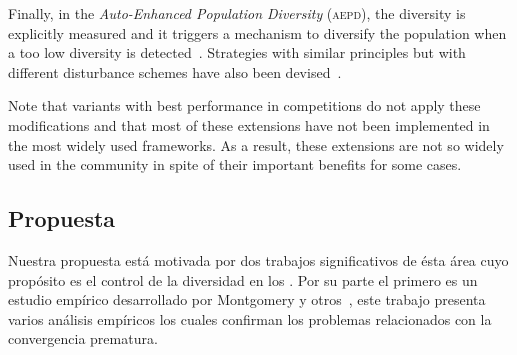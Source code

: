 Finally, in the \textit{Auto-Enhanced Population Diversity} (\textsc{aepd}), the diversity is explicitly measured and it triggers a mechanism
to diversify the population when a too low diversity is detected~\cite{yang2015differential}.
%
Strategies with similar principles but with different disturbance schemes have also been devised~\cite{zhao2016differential}.

Note that \DE{} variants with best performance in competitions do not apply these modifications
and that most of these extensions have not been implemented in the most widely used frameworks.
%
As a result, these extensions are not so widely used in the community in spite of their important benefits
for some cases.


\subsection{Propuesta}

Nuestra propuesta está motivada por dos trabajos significativos de ésta área cuyo propósito es el control de la diversidad en los \EAs{}.
%
Por su parte el primero es un estudio empírico desarrollado por Montgomery y otros~\cite{montgomery2012simple}, este trabajo presenta varios análisis empíricos los cuales confirman los problemas relacionados con la convergencia prematura.

